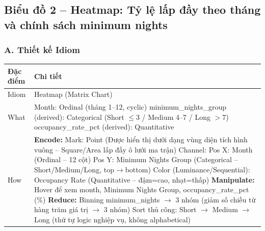 \subsection{Biểu đồ 2 -- Heatmap: Tỷ lệ lấp đầy theo tháng và chính sách minimum nights}

\subsubsection*{A. Thiết kế Idiom}

\begin{longtable}{|p{2.8cm}|p{11.5cm}|}
\hline
\textbf{Đặc điểm} & \textbf{Chi tiết} \\
\hline
\endhead
\hline
\endfoot
Idiom & Heatmap (Matrix Chart) \\
\hline
What & Month: Ordinal (tháng 1--12, cyclic) \newline
minimum\_nights\_group (derived): Categorical (Short $\leq$3 / Medium 4--7 / Long $>$7) \newline
occupancy\_rate\_pct (derived): Quantitative \\
\hline
How & \textbf{Encode:} \newline
\newline
Mark: Point (Được hiển thị dưới dạng vùng diện tích hình vuông -- Square/Area lấp đầy ô lưới ma trận) \newline
Channel: \newline
\hspace{0.3cm} Pos X: Month (Ordinal -- 12 cột) \newline
\hspace{0.3cm} Pos Y: Minimum Nights Group (Categorical -- Short/Medium/Long, top$\rightarrow$bottom) \newline
\hspace{0.3cm} Color (Luminance/Sequential): Occupancy Rate (Quantitative -- đậm=cao, nhạt=thấp) \newline
\newline
\textbf{Manipulate:} \newline
\newline
Hover để xem month, Minimum Nights Group, occupancy\_rate\_pct (\%) \newline
\newline
\textbf{Reduce:} \newline
\newline
Binning minimum\_nights $\rightarrow$ 3 nhóm (giảm số chiều từ hàng trăm giá trị $\rightarrow$ 3 nhóm) \newline
Sort thủ công: Short $\rightarrow$ Medium $\rightarrow$ Long (thứ tự logic nghiệp vụ, không alphabetical) \\

\end{longtable}
